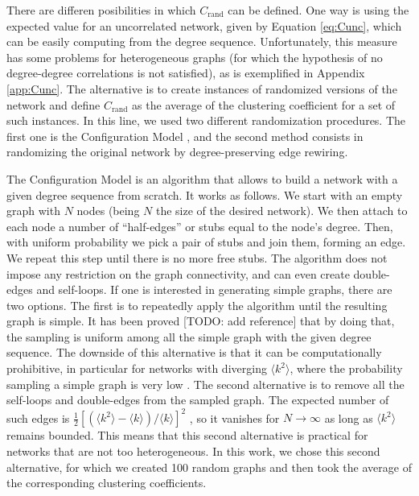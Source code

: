\documentclass{article}
\begin{document}
There are differen posibilities in which $C_{\mathrm{rand}}$ can be defined. One way is using the expected value for an uncorrelated network, given by Equation \ref{eq:Cunc}, which can be easily computing from the degree sequence. Unfortunately, this measure has some problems for heterogeneous graphs (for which the hypothesis of no degree-degree correlations is not satisfied), as is exemplified in Appendix \ref{app:Cunc}. The alternative is to create instances of randomized versions of the network and define $C_{\mathrm{rand}}$ as the average of the clustering coefficient for a set of such instances. In this line, we used two different randomization procedures. The first one is the Configuration Model \cite{Molloy1995ASequence}, and the second method consists in randomizing the original network by degree-preserving edge rewiring. %

The Configuration Model is an algorithm that allows to build a network with a given degree sequence from scratch. It works as follows. We start with an empty graph with $N$ nodes (being $N$ the size of the desired network). We then attach to each node a number of ``half-edges'' or stubs equal to the node's degree. Then, with uniform probability we pick a pair of stubs and join them, forming an edge. We repeat this step until there is no more free stubs. The algorithm does not impose any restriction on the graph connectivity, and can even create double-edges and self-loops. If one is interested in generating simple graphs, there are two options. The first is to repeatedly apply the algorithm until the resulting graph is simple. It has been proved [TODO: add reference] that by doing that, the sampling is uniform among all the simple graph with the given degree sequence. The downside of this alternative is that it can be computationally prohibitive, in particular for networks with diverging $\langle k^2 \rangle$, where the probability sampling a simple graph is very low \cite{NewmanBook}. The second alternative is to remove all the self-loops and double-edges from the sampled graph. The expected number of such edges is $\frac{1}{2} \left[ (\langle k^2 \rangle - \langle k \rangle ) / \langle k \rangle \right]^2$ \cite{NewmanBook}, so it vanishes for $N\rightarrow \infty$ as long as $\langle k^2 \rangle$ remains bounded. This means that this second alternative is practical for networks that are not too heterogeneous. In this work, we chose this second alternative, for which we created 100 random graphs and then took the average of the corresponding clustering coefficients.
\end{document}
